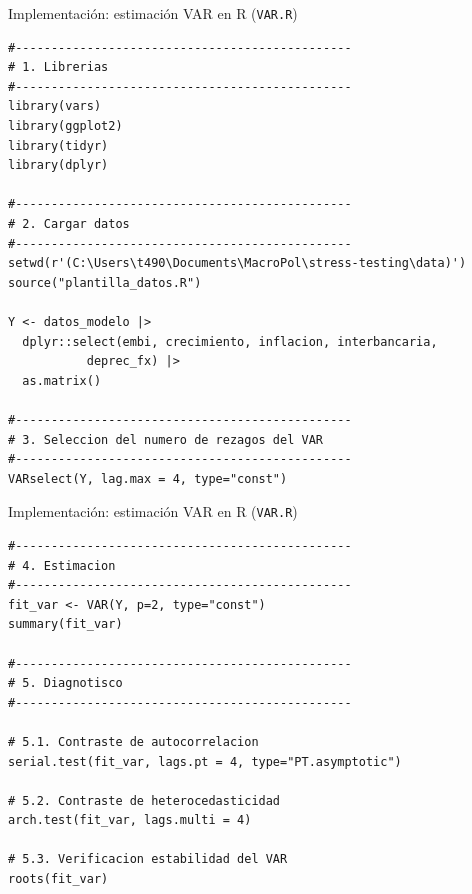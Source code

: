 \documentclass[10pt,aspectratio=169]{beamer}
\begin{document}
\begin{frame}[fragile]{Implementación: estimación VAR en R (\texttt{VAR.R})}
\begin{lstlisting}
#-----------------------------------------------
# 1. Librerias
#-----------------------------------------------
library(vars)
library(ggplot2)
library(tidyr)
library(dplyr)

#-----------------------------------------------
# 2. Cargar datos
#-----------------------------------------------
setwd(r'(C:\Users\t490\Documents\MacroPol\stress-testing\data)') 
source("plantilla_datos.R")

Y <- datos_modelo |>
  dplyr::select(embi, crecimiento, inflacion, interbancaria,
           deprec_fx) |>
  as.matrix()

#-----------------------------------------------
# 3. Seleccion del numero de rezagos del VAR
#-----------------------------------------------
VARselect(Y, lag.max = 4, type="const")
\end{lstlisting}
\end{frame}

\begin{frame}[fragile]{Implementación: estimación VAR en R (\texttt{VAR.R})}
\begin{lstlisting}
#-----------------------------------------------
# 4. Estimacion 
#-----------------------------------------------
fit_var <- VAR(Y, p=2, type="const")
summary(fit_var)

#-----------------------------------------------
# 5. Diagnotisco
#-----------------------------------------------

# 5.1. Contraste de autocorrelacion
serial.test(fit_var, lags.pt = 4, type="PT.asymptotic")

# 5.2. Contraste de heterocedasticidad
arch.test(fit_var, lags.multi = 4)

# 5.3. Verificacion estabilidad del VAR
roots(fit_var) 

\end{lstlisting}
\end{frame}
\end{document}

